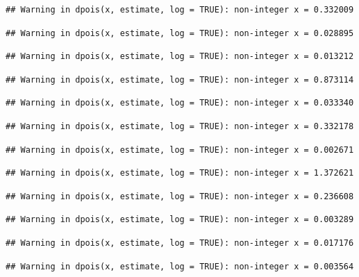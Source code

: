 \documentclass[]{article}
\begin{document}
\begin{verbatim}
## Warning in dpois(x, estimate, log = TRUE): non-integer x = 0.332009
\end{verbatim}

\begin{verbatim}
## Warning in dpois(x, estimate, log = TRUE): non-integer x = 0.028895
\end{verbatim}

\begin{verbatim}
## Warning in dpois(x, estimate, log = TRUE): non-integer x = 0.013212
\end{verbatim}

\begin{verbatim}
## Warning in dpois(x, estimate, log = TRUE): non-integer x = 0.873114
\end{verbatim}

\begin{verbatim}
## Warning in dpois(x, estimate, log = TRUE): non-integer x = 0.033340
\end{verbatim}

\begin{verbatim}
## Warning in dpois(x, estimate, log = TRUE): non-integer x = 0.332178
\end{verbatim}

\begin{verbatim}
## Warning in dpois(x, estimate, log = TRUE): non-integer x = 0.002671
\end{verbatim}

\begin{verbatim}
## Warning in dpois(x, estimate, log = TRUE): non-integer x = 1.372621
\end{verbatim}

\begin{verbatim}
## Warning in dpois(x, estimate, log = TRUE): non-integer x = 0.236608
\end{verbatim}

\begin{verbatim}
## Warning in dpois(x, estimate, log = TRUE): non-integer x = 0.003289
\end{verbatim}

\begin{verbatim}
## Warning in dpois(x, estimate, log = TRUE): non-integer x = 0.017176
\end{verbatim}

\begin{verbatim}
## Warning in dpois(x, estimate, log = TRUE): non-integer x = 0.003564
\end{verbatim}
\end{document}
